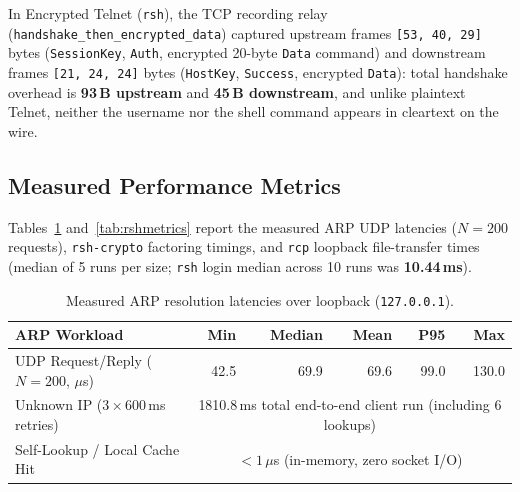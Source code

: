 \documentclass[11pt,a4paper]{article}
\begin{document}
In Encrypted Telnet (\texttt{rsh}), the TCP recording relay (\texttt{handshake\_then\_encrypted\_data}) captured upstream frames \texttt{[53, 40, 29]} bytes (\texttt{SessionKey}, \texttt{Auth}, encrypted 20-byte \texttt{Data} command) and downstream frames \texttt{[21, 24, 24]} bytes (\texttt{HostKey}, \texttt{Success}, encrypted \texttt{Data}): total handshake overhead is \textbf{93\,B upstream} and \textbf{45\,B downstream}, and unlike plaintext Telnet, neither the username nor the shell command appears in cleartext on the wire.

\subsection{Measured Performance Metrics}

Tables~\ref{tab:arpmetrics} and~\ref{tab:rshmetrics} report the measured ARP UDP latencies ($N=200$ requests), \texttt{rsh-crypto} factoring timings, and \texttt{rcp} loopback file-transfer times (median of 5 runs per size; \texttt{rsh} login median across 10 runs was \textbf{10.44\,ms}).

\begin{table}[H]
\centering
\small
\begin{tabular}{@{}l r r r r r@{}}
\toprule
\textbf{ARP Workload} & \textbf{Min} & \textbf{Median} & \textbf{Mean} & \textbf{P95} & \textbf{Max} \\
\midrule
UDP Request/Reply ($N=200$, $\mu$s) & 42.5 & 69.9 & 69.6 & 99.0 & 130.0 \\
Unknown IP ($3\times 600$\,ms retries) & \multicolumn{5}{c}{1810.8\,ms total end-to-end client run (including 6 lookups)} \\
Self-Lookup / Local Cache Hit & \multicolumn{5}{c}{$< 1$\,$\mu$s (in-memory, zero socket I/O)} \\
\bottomrule
\end{tabular}
\caption{Measured ARP resolution latencies over loopback (\texttt{127.0.0.1}).}
\label{tab:arpmetrics}
\end{table}
\end{document}
